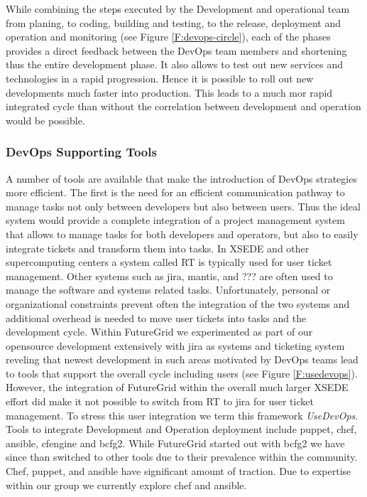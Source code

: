 While combining the steps executed by the Development and operational
team from planing, to coding, building and testing, to the release,
deployment and operation and monitoring (see Figure
\ref{F:devops-circle}), each of the phases provides a direct feedback
between the DevOps team members and shortening thus the entire
development phase. It also allows to test out new services and
technologies in a rapid progression. Hence it is possible to roll out
new developments much faster into production. This leads to a much mor
rapid integrated cycle than without the correlation between
development and operation would be possible.

\subsubsection{DevOps Supporting Tools}

A number of tools are available that make the introduction of DevOps
strategies more efficient. The first is the need for an efficient
communication pathway to manage tasks not only between developers but
also between users. Thus the ideal system would provide a complete
integration of a project management system that allows to manage tasks
for both developers and operators, but also to easily integrate
tickets and transform them into tasks. In XSEDE and other
supercomputing centers a system called RT is typically used for user
ticket management. Other systems such as jira, mantis, and ??? are
often used to manage the software and systems related
tasks. Unfortunately, personal or organizational constraints prevent
often the integration of the two systems and additional overhead is
needed to move user tickets into tasks and the development
cycle. Within FutureGrid we experimented as part of our opensource
development extensively with jira as systems and ticketing system
reveling that newest development in such areas motivated by DevOps
teams lead to tools that support the overall cycle including users
(see Figure \ref{F:usedevops}). However, the integration of
FutureGrid within the overall much larger XSEDE effort did make it not
possible to switch from RT to jira for user ticket
management. To stress this user integration we term this framework
{\em UseDevOps}. Tools to integrate Development and Operation
deployment include puppet, chef, ansible, cfengine and bcfg2. While
FutureGrid started out with bcfg2 we have since than switched to other
tools due to their prevalence within the community. Chef, puppet, and
ansible have significant amount of traction. Due to expertise within
our group we currently explore chef and ansible. 

